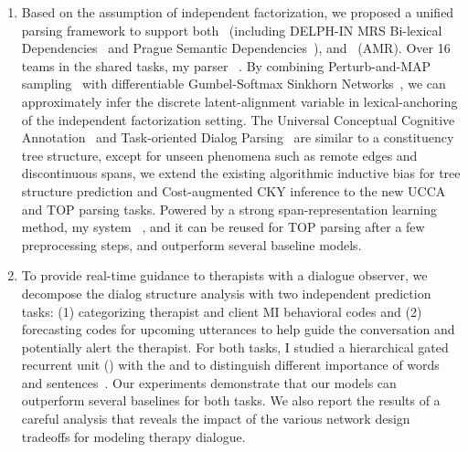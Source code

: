 \begin{enumerate}
\item Based on the assumption of independent factorization, we
  proposed a unified parsing framework to support
  both~ (including DELPH-IN MRS
  Bi-lexical Dependencies~\citep[DM,][]{ivanova2012did} and Prague
  Semantic
  Dependencies~\citep[PSD,][]{hajic2012announcing,miyao2014house}),
  and ~(AMR). Over 16 teams in the
  shared tasks, my parser~\citep{cao2019amazon} . By combining Perturb-and-MAP
  sampling~\citep{papandreouperturb} with differentiable
  Gumbel-Softmax Sinkhorn Networks~\citep{mena2018learning}, we can
  approximately infer the discrete latent-alignment variable in
  lexical-anchoring of the independent factorization setting. The
   Universal Conceptual Cognitive
  Annotation~\citep[UCCA,][]{abend2013universal} and Task-oriented
  Dialog Parsing~\citep[TOP,][]{gupta-etal-2018-semantic-parsing} are
  similar to a constituency tree structure, except for unseen phenomena
  such as remote edges and discontinuous spans, we extend the existing
  algorithmic inductive bias for tree structure prediction and
  Cost-augmented CKY inference to the new UCCA and TOP parsing
  tasks. Powered by a strong span-representation learning method, my
  system~\citep{cao2019amazon} , and
  it can be reused for TOP parsing after a few preprocessing steps,
  and outperform several baseline models.

\item To provide real-time guidance to therapists with a dialogue
  observer, we decompose the dialog structure analysis with two
  independent prediction tasks: (1) categorizing therapist and client
  MI behavioral codes and (2) forecasting codes for upcoming
  utterances to help guide the conversation and potentially alert the
  therapist. For both tasks, I studied a hierarchical gated recurrent
  unit (\HGRU) with the  and
   to distinguish different importance of
  words and sentences~\citep{jie2019psycdialacl}. Our experiments
  demonstrate that our models can outperform several baselines for
  both tasks. We also report the results of a careful analysis that
  reveals the impact of the various network design tradeoffs for
  modeling therapy dialogue.


\end{enumerate}
